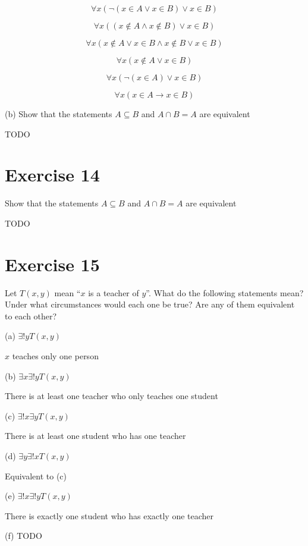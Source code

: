 \documentclass[11pt]{article}
\newcommand{\then}{\rightarrow}
\begin{document}
$$\forall x (\neg (x \in A \vee x \in B) \vee x \in B)$$

$$\forall x ((x \notin A \wedge x \notin B) \vee x \in B)$$

$$\forall x (x \notin A \vee x \in B \wedge x \notin B \vee x \in B)$$

$$\forall x (x \notin A \vee x \in B)$$

$$\forall x (\neg (x \in A) \vee x \in B)$$

$$\forall x (x \in A \then x \in B)$$

\noindent (b) Show that the statements $A \subseteq B$ and $A \cap B = A$ are 
equivalent

TODO

\section*{Exercise 14}

Show that the statements $A \subseteq B$ and $A \cap B = A$ are equivalent

TODO

\section*{Exercise 15}

Let $T(x, y)$ mean ``$x$ is a teacher of $y$''. What do the following statements
mean? Under what circumstances would each one be true? Are any of them
equivalent to each other?

\noindent (a) $\exists! y T(x,y)$

$x$ teaches only one person

\noindent (b) $\exists x \exists! y T(x,y)$

There is at least one teacher who only teaches one student 

\noindent (c) $\exists! x \exists y T(x,y)$

There is at least one student who has one teacher

\noindent (d) $\exists y \exists! x T(x, y)$

Equivalent to (c)

\noindent (e) $\exists! x \exists! y T(x, y)$

There is exactly one student who has exactly one teacher 

\noindent (f) TODO
\end{document}
